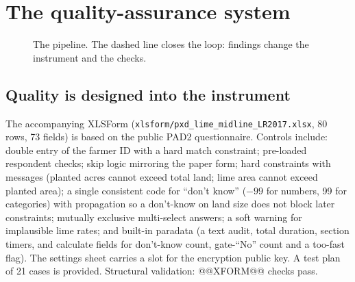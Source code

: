 \documentclass[11pt,a4paper]{article}
\begin{document}
\section{The quality-assurance system}\label{sec:system}
\begin{figure}[H]\centering
{}
\caption{The pipeline. The dashed line closes the loop: findings change the instrument and the checks.}\end{figure}

\subsection{Quality is designed into the instrument}
The accompanying XLSForm (\texttt{xlsform/pxd\_lime\_midline\_LR2017.xlsx}, 80 rows, 73 fields) is based on the public PAD2 questionnaire. Controls include: double entry of the farmer ID with a hard match constraint; pre-loaded respondent checks; skip logic mirroring the paper form; hard constraints with messages (planted acres cannot exceed total land; lime area cannot exceed planted area); a single consistent code for ``don't know'' ($-99$ for numbers, 99 for categories) with propagation so a don't-know on land size does not block later constraints; mutually exclusive multi-select answers; a soft warning for implausible lime rates; and built-in paradata (a text audit, total duration, section timers, and calculate fields for don't-know count, gate-``No'' count and a too-fast flag). The settings sheet carries a slot for the encryption public key. A test plan of 21 cases is provided. Structural validation: @@XFORM@@ checks pass.
\end{document}
